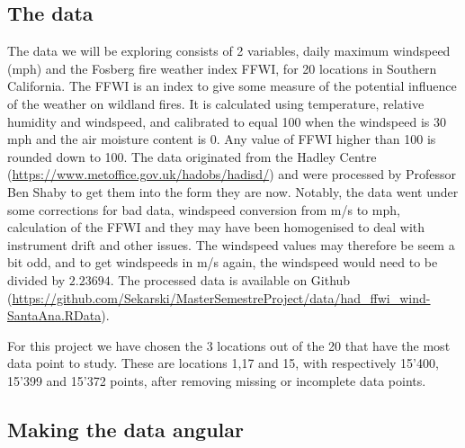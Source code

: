 \subsection{The data}
The data we will be exploring consists of 2 variables, daily maximum windspeed (mph) and the Fosberg fire weather index FFWI, for 20 locations in Southern California. The FFWI is an index to give some measure of the potential influence of the weather on wildland fires. It is calculated using temperature, relative humidity and windspeed, and calibrated to equal 100 when the windspeed is 30 mph and the air moisture content is 0. Any value of FFWI higher than 100 is rounded down to 100.
The data originated from the Hadley Centre (\url{https://www.metoffice.gov.uk/hadobs/hadisd/}) and were processed by Professor Ben Shaby to get them into the form they are now. Notably, the data went under some corrections for bad data, windspeed conversion from m/s to mph, calculation of the FFWI and they may have been homogenised to deal with instrument drift and other issues. The windspeed values may therefore be seem a bit odd, and to get windspeeds in m/s again, the windspeed would need to be divided by $2.23694$.
The processed data is available on Github (\url{https://github.com/Sekarski/MasterSemestreProject/data/had_ffwi_wind-SantaAna.RData}).

For this project we have chosen the 3 locations out of the 20 that have the most data point to study. These are locations 1,17 and 15, with respectively 15'400, 15'399 and 15'372 points, after removing missing or incomplete data points.

\subsection{Making the data angular}

